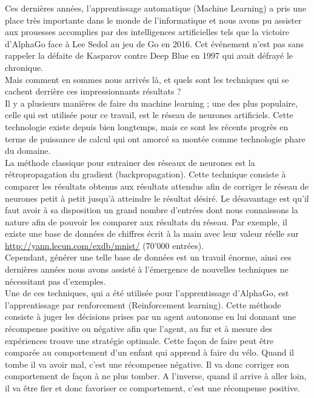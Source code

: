 \documentclass{article}
\begin{document}
Ces dernières années, l'apprentissage automatique (Machine Learning) a pris une place très importante dans le monde de l'informatique et nous avons pu assister aux prouesses accomplies par des intelligences artificielles tels que la victoire d'AlphaGo face à Lee Sedol au jeu de Go en 2016\cite{wikialphagolee}. Cet événement n'est pas sans rappeler la défaite de Kasparov contre Deep Blue en 1997 qui avait défrayé le chronique\cite{kasparov}.\\
Mais comment en sommes nous arrivés là, et quels sont les techniques qui se cachent derrière ces impressionnants résultats ?\\
Il y a plusieurs manières de faire du machine learning ; une des plus populaire, celle qui est utilisée pour ce travail, est le réseau de neurones artificiels. Cette technologie existe depuis bien longtemps, mais ce sont les récents progrès en terme de puissance de calcul qui ont amorcé sa montée comme technologie phare du domaine\cite{nnpower}.\\

La méthode classique pour entrainer des réseaux de neurones est la rétropropagation du gradient (backpropagation). Cette technique consiste à comparer les résultats obtenus aux résultats attendus afin de corriger le réseau de neurones petit à petit jusqu'à atteindre le résultat désiré. Le désavantage est qu'il faut avoir à sa disposition un grand nombre d'entrées dont nous connaissons la nature afin de pouvoir les comparer aux résultats du réseau. Par exemple, il existe une base de données de chiffres écrit à la main avec leur valeur réelle sur \url{http://yann.lecun.com/exdb/mnist/} (70'000 entrées).\\

Cependant, générer une telle base de données est un travail énorme, ainsi ces dernières années nous avons assisté à l'émergence de nouvelles techniques ne nécessitant pas d'exemples.\\

Une de ces techniques, qui a été utilisée pour l'apprentissage d'AlphaGo\cite{alphago}, est l'apprentissage par renforcement (Reinforcement learning). Cette méthode consiste à juger les décisions prises par un agent autonome en lui donnant une récompense positive ou négative afin que l'agent, au fur et à mesure des expériences trouve une stratégie optimale\cite{wikirl}. Cette façon de faire peut être comparée au comportement d'un enfant qui apprend à faire du vélo. Quand il tombe il va avoir mal, c'est une récompense négative. Il va donc corriger son comportement de façon à ne plus tomber. A l'inverse, quand il arrive à aller loin, il va être fier et donc favoriser ce comportement, c'est une récompense positive.\\
\end{document}
